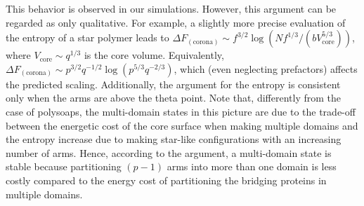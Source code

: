 \documentclass[a4paper,12pt,pre,superscriptaddress]{revtex4}
\begin{document}
This  behavior is observed in our simulations.  However, this
argument can be regarded as only qualitative. For example, a slightly
more precise evaluation of the entropy of a star polymer leads to $
\Delta F_\mathrm{(corona)} \sim f^{3/2} \log\left(Nf^{1/3}/(b
  V_\mathrm{core}^{5/3}) \right)$, where $V_\mathrm{core}\sim q^{1/3}$
is the core volume. Equivalently, $ \Delta F_\mathrm{(corona)} \sim
p^{3/2}q^{-1/2} \log\left( p^{5/3}q^{-2/3} \right)$, which (even
neglecting prefactors) affects the predicted scaling. Additionally,
the argument for the entropy is consistent only when the arms are
above the theta point.
Note that, differently from the case of polysoaps, the multi-domain
states in this picture are due to the trade-off between the energetic
cost of the core surface when making multiple domains and the entropy
increase due to making star-like configurations with an increasing
number of arms.  Hence, according to the argument, a multi-domain
state is stable because partitioning $(p-1)$ arms into more than one
domain is less costly compared to the energy cost of partitioning the
bridging proteins in multiple domains.
  
\end{document}
